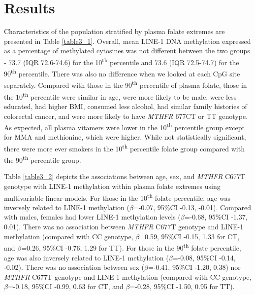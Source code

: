 \section{Results} %
\noindent Characteristics of the population stratified by plasma folate extremes are presented in Table \ref{table3_1}. Overall, mean LINE-1 DNA methylation expressed as a percentage of methylated cytosines was not different between the two groups - 73.7 (IQR 72.6-74.6) for the 10\textsuperscript{th} percentile and 73.6 (IQR 72.5-74.7) for the 90\textsuperscript{th} percentile. There was also no difference when we looked at each CpG site separately. Compared with those in the 90\textsuperscript{th} percentile of plasma folate, those in the 10\textsuperscript{th} percentile were similar in age, were more likely to be male, were less educated, had higher BMI, consumed less alcohol, had similar family histories of colorectal cancer, and were more likely to have \emph{MTHFR} 677CT or TT genotype. As expected, all plasma vitamers were lower in the 10\textsuperscript{th} percentile group except for MMA and methionine, which were higher. While not statistically significant, there were more ever smokers in the 10\textsuperscript{th} percentile folate group compared with the 90\textsuperscript{th} percentile group.

\noindent Table \ref{table3_2} depicts the associations between age, sex, and \emph{MTHFR} C677T genotype with LINE-1 methylation within plasma folate extremes using multivariable linear models. For those in the 10\textsuperscript{th} folate percentile, age was inversely related to LINE-1 methylation ($\beta$=-0.07, 95\%CI -0.13, -0.01). Compared with males, females had lower LINE-1 methylation levels ($\beta$=-0.68, 95\%CI -1.37, 0.01). There was no association between \emph{MTHFR} C677T genotype and LINE-1 methylation (compared with CC genotype, $\beta$=0.59, 95\%CI -0.15, 1.33 for CT, and $\beta$=0.26, 95\%CI -0.76, 1.29 for TT). For those in the 90\textsuperscript{th} folate percentile, age was also inversely related to LINE-1 methylation ($\beta$=-0.08, 95\%CI -0.14, -0.02). There was no association between sex ($\beta$=-0.41, 95\%CI -1.20, 0.38) nor \emph{MTHFR} C677T genotype and LINE-1 methylation (compared with CC genotype, $\beta$=-0.18, 95\%CI -0.99, 0.63 for CT, and $\beta$=-0.28, 95\%CI -1.50, 0.95 for TT). 


